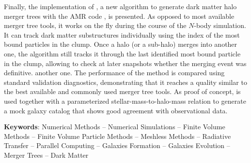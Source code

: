 Finally, the implementation of \acacia, a new algorithm to generate dark matter halo merger trees
with the AMR code \ramses, is presented.
As opposed to most available merger tree tools, it works on the fly during the course of the
$N$-body simulation. It can track dark matter substructures individually using the index of the most
bound particles in the clump.
Once a halo (or a sub-halo) merges into another one, the algorithm still tracks it through the last
identified most bound particle in the clump, allowing to check at later snapshots whether the
merging event was definitive. %
another one.
The performance of the method is compared using standard validation diagnostics, demonstrating that
it reaches a quality similar to the best available and commonly used merger tree tools. As proof of
concept, \acacia is used together with a parameterized stellar-mass-to-halo-mass relation to generate
a mock galaxy catalog that shows good agreement with observational data.

\hspace{1cm}

\textbf{Keywords}: Numerical Methods -- Numerical Simulations -- Finite Volume Methods -- Finite
Volume Particle Methods -- Meshless Methods -- Radiative Transfer -- Parallel Computing -- Galaxies
Formation -- Galaxies Evolution -- Merger Trees -- Dark Matter



\cleardoublepage

